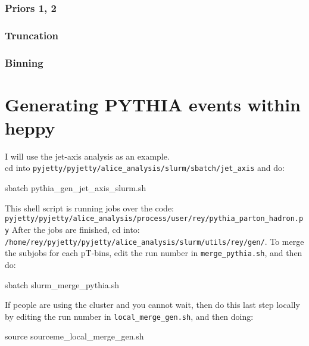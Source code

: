 \documentclass[12pt]{article}
\begin{document}
\subsubsection{Priors 1, 2}
\subsubsection{Truncation}
\subsubsection{Binning}

\section{Generating PYTHIA events within heppy}

I will use the jet-axis analysis as an example. \\
cd into \verb|pyjetty/pyjetty/alice_analysis/slurm/sbatch/jet_axis| and do:

\begin{tcolorbox}
\begin{verbnobox}[\scriptsize]
sbatch pythia_gen_jet_axis_slurm.sh
\end{verbnobox}  
\end{tcolorbox}

This shell script is running jobs over the code: \\ \verb|pyjetty/pyjetty/alice_analysis/process/user/rey/pythia_parton_hadron.py|
After the jobs are finished, cd into: \verb|/home/rey/pyjetty/pyjetty/alice_analysis/slurm/utils/rey/gen/|. 
To merge the subjobs for each pT-bins, edit the run number in \verb|merge_pythia.sh|, and then do:

\begin{tcolorbox}
\begin{verbnobox}[\scriptsize]
sbatch slurm_merge_pythia.sh
\end{verbnobox}  
\end{tcolorbox}

If people are using the cluster and you cannot wait, then do this last step locally by editing the run number in \verb|local_merge_gen.sh|, and then doing:

\begin{tcolorbox}
\begin{verbnobox}[\scriptsize]
source sourceme_local_merge_gen.sh
\end{verbnobox}  
\end{tcolorbox}
\end{document}

